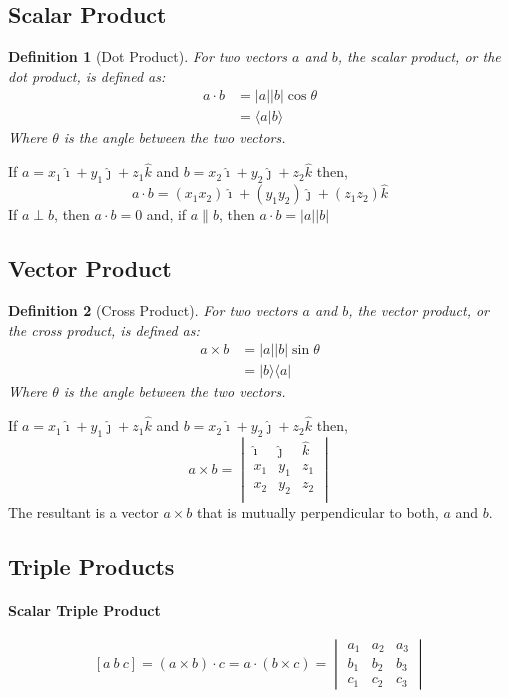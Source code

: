 \documentclass[12pt]{article}
\newtheorem{defn}{Definition}
\begin{document}
\subsection{Scalar Product}
\begin{defn}[Dot Product]
For two vectors $a$ and $b$, the scalar product, or the dot product, is defined as:
\begin{align*}
a \cdot b &= \lvert a \rvert \lvert b \rvert \cos\theta \\
&= \langle a |b \rangle
\end{align*}
Where $\theta$ is the angle between the two vectors.
\end{defn}
If $a = x_1 \hat{\imath} + y_1 \hat{\jmath} + z_1 \hat{k}$ and $b = x_2 \hat{\imath} + y_2 \hat{\jmath} + z_2 \hat{k}$ then, 	 
$$a \cdot b = (x_1 x_2)\hat{\imath} + (y_1 y_2)\hat{\jmath} + (z_1 z_2)\hat{k}$$
If $a \perp b$, then $a\cdot b = 0$ and, if $a \parallel b$, then $a\cdot b = |a||b|$ 

\subsection{Vector Product}
\begin{defn}[Cross Product]
For two vectors $a$ and $b$, the vector product, or the cross product, is defined as:
\begin{align*}
a\times b &= \lvert a \rvert \lvert b \rvert \sin\theta \\
&=|b\rangle \langle a|
\end{align*}
Where $\theta$ is the angle between the two vectors.
\end{defn}
If $a = x_1 \hat{\imath} + y_1 \hat{\jmath} + z_1 \hat{k}$ and $b = x_2 \hat{\imath} + y_2 \hat{\jmath} + z_2 \hat{k}$ then,
$$
a \times b =  
\begin{vmatrix}
\hat{\imath} & \hat{\jmath} & \hat{k} \\
x_1 & y_1 & z_1 \\
x_2 & y_2 & z_2 \\
\end{vmatrix}
$$
The resultant is a vector $a\times{b}$ that is mutually perpendicular to both, $a$ and $b$.
\subsection{Triple Products}
\paragraph{Scalar Triple Product}
$$[a\  b\  c] = (a\times b)\cdot c = a\cdot(b\times c) = \begin{vmatrix}
a_1 & a_2 & a_3 \\
b_1 & b_2 & b_3 \\
c_1 & c_2 & c_3
\end{vmatrix}$$
\end{document}
